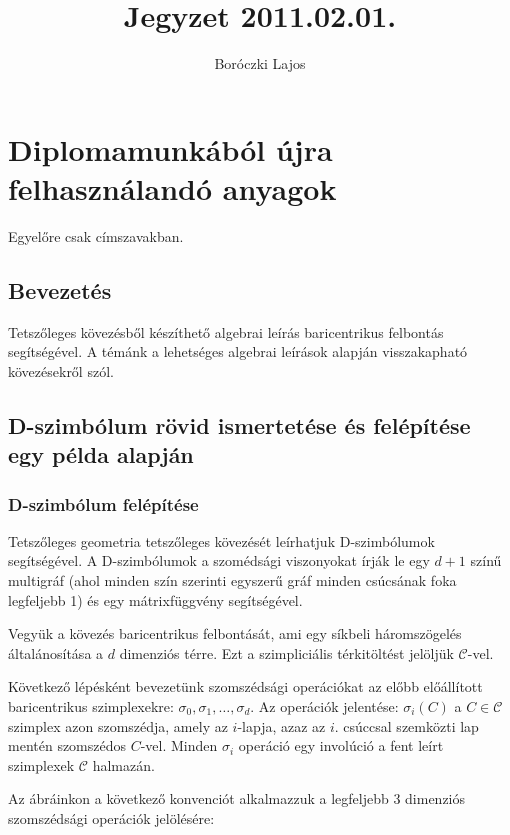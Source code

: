 \documentclass[12pt,magyar,a4paper]{article}
\begin{document}
\title{Jegyzet 2011.02.01.}
\author{Boróczki Lajos}

\maketitle

\section{Diplomamunkából újra felhasználandó anyagok}
Egyelőre csak címszavakban.

\subsection{Bevezetés}
Tetszőleges kövezésből készíthető algebrai leírás baricentrikus felbontás
segítségével. A témánk a lehetséges algebrai leírások alapján visszakapható
kövezésekről szól.

\subsection{D-szimbólum rövid ismertetése és felépítése egy példa alapján}
\subsubsection{D-szimbólum felépítése}
Tetszőleges geometria tetszőleges kövezését leírhatjuk D-szimbólumok
segítségével. A D-szimbólumok a szomédsági viszonyokat írják le egy $d+1$ színű
multigráf (ahol minden szín szerinti egyszerű gráf minden csúcsának foka
legfeljebb 1) és egy mátrixfüggvény segítségével.

Vegyük a kövezés baricentrikus felbontását, ami egy síkbeli háromszögelés
általánosítása a $d$ dimenziós térre. Ezt a szimpliciális térkitöltést jelöljük
$\mathcal{C}$-vel.

Következő lépésként bevezetünk szomszédsági operációkat az előbb előállított
baricentrikus szimplexekre: $\sigma_0,\sigma_1,\ldots,\sigma_d.$ Az operációk
jelentése: $\sigma_i(C)$ a $C\in \mathcal{C}$ szimplex azon szomszédja, amely az
$i$-lapja, azaz az $i$. csúccsal szemközti lap mentén szomszédos $C$-vel.
Minden $\sigma_i$ operáció egy involúció a fent leírt szimplexek $\mathcal{C}$
halmazán.

Az ábráinkon a következő konvenciót alkalmazzuk a legfeljebb 3 dimenziós
szomszédsági operációk jelölésére:
\end{document}
